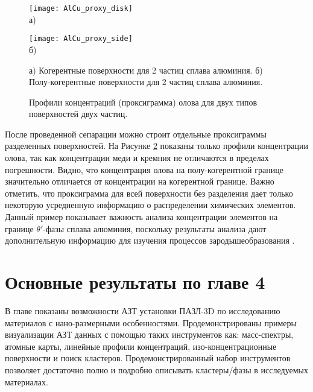 \begin{figure}[htb]
	\begin{minipage}[b][][b]{0.49\textwidth}\centering
		\texttt{[image: AlCu\_proxy\_disk]} \\ а)
	\end{minipage}
	\begin{minipage}[b][][b]{0.49\textwidth}\centering
		\texttt{[image: AlCu\_proxy\_side]} \\ б)
	\end{minipage}
	\caption{а) Когерентные поверхности для 2 частиц сплава алюминия. б) Полу-когерентные поверхности для 2 частиц сплава алюминия.}
	\label{fig:AlCu_proxy_disk_side}
\end{figure}

\begin{figure}[htb]
	\caption{Профили концентраций (проксиграмма) олова для двух типов поверхностей двух частиц.}
	\label{fig:AlCu_Sn_proxy}
\end{figure}

\FloatBarrier

После проведенной сепарации можно строит отдельные проксиграммы разделенных поверхностей. На Рисунке \cref{fig:AlCu_Sn_proxy} показаны только профили концентрации олова, так как концентрации меди и кремния не отличаются в пределах погрешности. Видно, что концентрация олова на полу-когерентной границе значительно отличается от концентрации на когерентной границе. Важно отметить, что проксиграмма для всей поверхности без разделения дает только некоторую усредненную информацию о распределении химических элементов. Данный пример показывает важность анализа концентрации элементов на границе $\theta '$-фазы сплава алюминия, поскольку результаты анализа дают дополнительную информацию для изучения процессов зародышеобразования \cite{Akopyan2022A319}.



 

\FloatBarrier
\clearpage
\section{Основные результаты по главе 4}\label{sec:ch4/sect5}


В главе показаны возможности АЗТ установки ПАЗЛ-3D по исследованию материалов с нано-размерными особенностями. Продемонстрированы примеры визуализации АЗТ данных с помощью таких инструментов как: масс-спектры, атомные карты, линейные профили концентраций, изо-концентрационные поверхности и поиск кластеров. Продемонстрированный набор инструментов позволяет достаточно полно и подробно описывать кластеры/фазы в исследуемых материалах.

